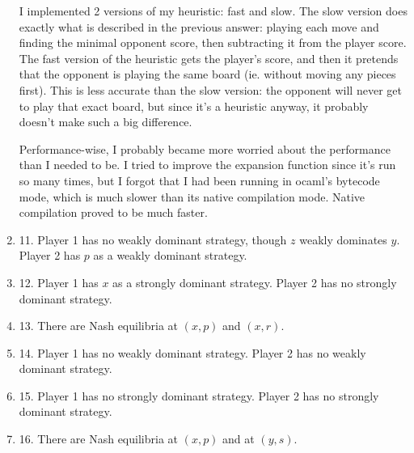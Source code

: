 \documentclass[12pt]{article}
\begin{document}
\begin{enumerate}
	I implemented 2 versions of my heuristic: fast and slow. The slow version does exactly what is described in the previous answer: playing each move and finding the minimal opponent score, then subtracting it from the player score. The fast version of the heuristic gets the player's score, and then it pretends that the opponent is playing the same board (ie. without moving any pieces first). This is less accurate than the slow version: the opponent will never get to play that exact board, but since it's a heuristic anyway, it probably doesn't make such a big difference.

	Performance-wise, I probably became more worried about the performance than I needed to be. I tried to improve the expansion function since it's run so many times, but I forgot that I had been running in ocaml's bytecode mode, which is much slower than its native compilation mode. Native compilation proved to be much faster.

\item 11. Player 1 has no weakly dominant strategy, though $z$ weakly dominates $y$. Player 2 has $p$ as a weakly dominant strategy.

\item 12. Player 1 has $x$ as a strongly dominant strategy. Player 2 has no strongly dominant strategy.

\item 13. There are Nash equilibria at $(x,p)$ and $(x, r)$. 

\item 14. Player 1 has no weakly dominant strategy. Player 2 has no weakly dominant strategy.

\item 15. Player 1 has no strongly dominant strategy. Player 2 has no strongly dominant strategy.

\item 16. There are Nash equilibria at $(x,p)$ and at $(y,s)$.
\end{enumerate}
\end{document}
